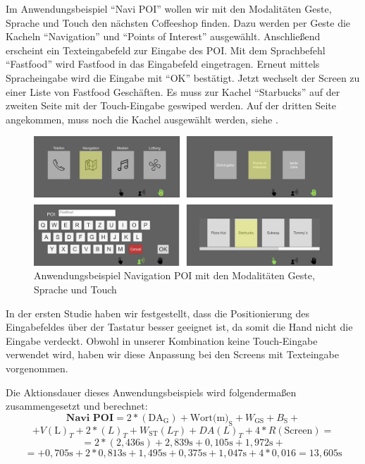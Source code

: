 Im Anwendungsbeispiel "`Navi POI"' wollen wir mit den Modalitäten Geste, Sprache und Touch den nächsten Coffeeshop finden. 
Dazu werden per Geste die Kacheln "`Navigation"' und "`Points of Interest"' ausgewählt. 
Anschließend erscheint ein Texteingabefeld zur Eingabe des POI. 
Mit dem Sprachbefehl "`Fastfood"' wird Fastfood in das Eingabefeld eingetragen. 
Erneut mittels Spracheingabe wird die Eingabe mit "`OK"' bestätigt. 
Jetzt wechselt der Screen zu einer Liste von Fastfood Geschäften. 
Es muss zur Kachel "`Starbucks"' auf der zweiten Seite mit der Touch-Eingabe geswiped werden. 
Auf der dritten Seite angekommen, muss noch die Kachel ausgewählt werden, siehe .  
\begin{figure}[ht]
	\centering
		\includegraphics[width=1\textwidth]{img/UseCases_Eval_Navi_POI.jpg}
	\caption{Anwendungsbeispiel Navigation POI mit den Modalitäten Geste, Sprache und Touch}
	\label{fig:UseCasesEvalNaviPOI}
\end{figure}

In der ersten Studie haben wir festgestellt, dass die Positionierung des Eingabefeldes über der Tastatur besser geeignet ist, da somit die Hand nicht die Eingabe verdeckt.
Obwohl in unserer Kombination keine Touch-Eingabe verwendet wird, haben wir diese Anpassung bei den Screens mit Texteingabe vorgenommen.

Die Aktionsdauer dieses Anwendungsbeispiels wird folgendermaßen zusammengesetzt und berechnet:
\[	
\textbf{Navi POI} = 2*(\text{DA}_\text{G}) + \text{Wort(m)}_\text{S} + W_\text{GS} + B_\text{S} + 
\]
\[	
+ V(\text{L})_T + 2*(L)_T + W_\text{ST}(L_T) + DA(L)_T + 4*R(\text{Screen}) =
\]
\[
= 2*( 2,436\text{s}) + 2,839\text{s} + 0,105\text{s} + 1,972\text{s} + 
\]
\[
= + 0,705\text{s} + 2*0,813\text{s} + 1,495\text{s} + 0,375\text{s} + 1,047\text{s} + 4*0,016= 13,605\text{s}
\]

